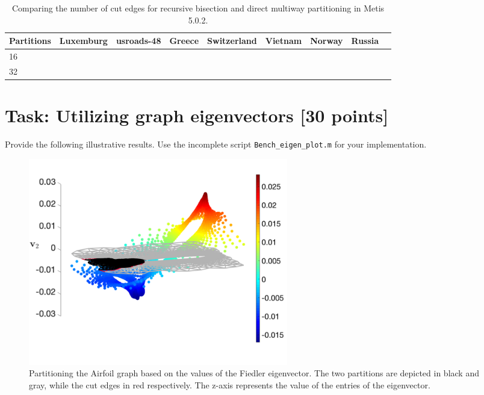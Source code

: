 \documentclass[unicode,11pt,a4paper,oneside,numbers=endperiod,openany]{scrartcl}
\begin{document}
\begin{table}[h]
\caption{Comparing the number of cut edges for recursive bisection and direct multiway partitioning in Metis 5.0.2.}
\centering
\begin{tabular}{l|r|r|r|r|r|r|r|r} \hline\hline 
Partitions       &   Luxemburg           & usroads-48 &  Greece &  Switzerland &  Vietnam  &  Norway &  Russia  \\ \hline
 16              &                       &            &         &              &           &         &          \\             
 32              &                       &            &         &              &           &         &          \\ \hline \hline
\end{tabular}              
\label{table:Compare_Metis}
\end{table}



\section{Task: Utilizing graph eigenvectors [30 points]}


Provide the following illustrative results. Use the incomplete script \texttt{Bench\_eigen\_plot.m} for your implementation.

\begin{figure}[!t]
	\begin{center}
		\includegraphics[width=0.55\textwidth]{images/fiedler_airfoil.png}
		\caption{Partitioning the Airfoil graph based on the values of the Fiedler eigenvector. The two partitions are depicted in black and gray, while the cut edges in red respectively. The z-axis represents the value of the entries of the eigenvector.}
		 \label{fig:fiedler_airfoil}
	\end{center}
\end{figure}
\end{document}
